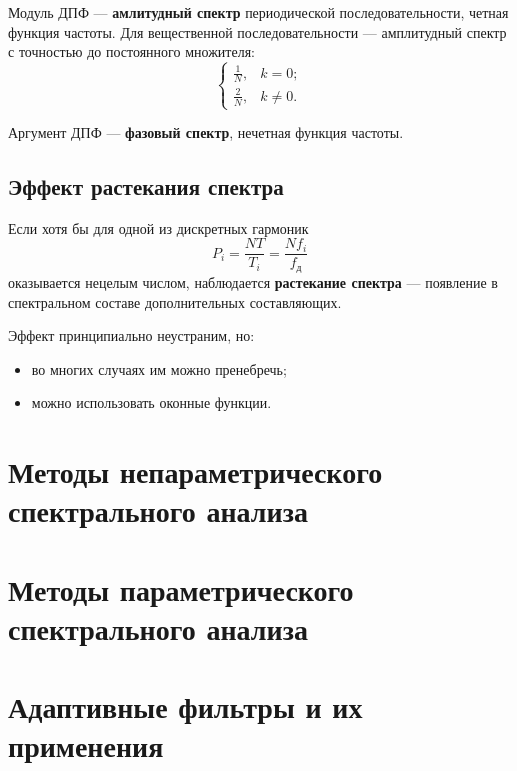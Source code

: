\documentclass[a4paper, 14pt]{extarticle}
\begin{document}
Модуль ДПФ --- \textbf{амлитудный спектр} периодической последовательности, четная функция частоты. Для вещественной последовательности --- амплитудный спектр с точностью до постоянного множителя:
\begin{equation}
    \begin{cases}
        \frac{1}{N}, &k=0;\\
        \frac{2}{N}, &k\ne 0.
    \end{cases}
\end{equation}

Аргумент ДПФ --- \textbf{фазовый спектр}, нечетная функция частоты.

\subsection{Эффект растекания спектра}
Если хотя бы для одной из дискретных гармоник
\begin{equation}
    P_i = \frac{NT}{T_i} = \frac{Nf_i}{f_\text{д}} 
\end{equation}
оказывается нецелым числом, наблюдается \textbf{растекание спектра} --- появление в спектральном составе дополнительных составляющих. 

Эффект принципиально неустраним, но:
\begin{itemize}
    \item во многих случаях им можно пренебречь;
    \item можно использовать оконные функции.
\end{itemize}

\section{Методы непараметрического спектрального анализа}
\lipsum[1] %

\section{Методы параметрического спектрального анализа}
\lipsum[1] %

\section{Адаптивные фильтры и их применения}
\lipsum[1] %
\end{document}
